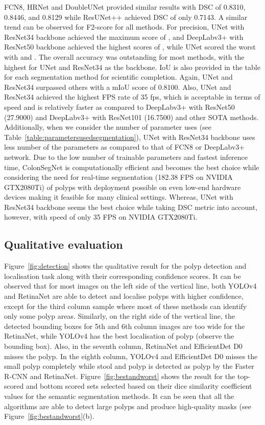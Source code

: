 \documentclass[journal]{IEEEtran}
\begin{document}
FCN8, HRNet and DoubleUNet provided similar results with DSC of 0.8310, 0.8446, and 0.8129 while ResUNet++ achieved DSC of only 0.7143. A similar trend can be observed for F2-score for all methods. For precision, UNet with ResNet34 backbone achieved the maximum score of , and DeepLabv3+ with ResNet50 backbone achieved the highest scores of , while UNet scored the worst with  and . The overall accuracy was outstanding for most methods, with the highest for UNet and ResNet34 as the backbone. IoU is also provided in the table for each segmentation method for scientific completion.  Again, UNet and ResNet34 surpassed others with a mIoU score of 0.8100. Also, UNet and ResNet34 achieved the highest \ac{FPS} rate of 35 fps, which is acceptable in terms of speed and is relatively faster as compared to  DeepLabv3+ with ResNet50 (27.9000) and DeepLabv3+ with ResNet101 (16.7500) and other SOTA methods. Additionally, when we consider the number of parameter uses (see Table~\ref{table:parametersusedsegmentation}), UNet with ResNet34 backbone uses less number of the parameters as compared to that of FCN8 or DeepLabv3+ network. Due to the low number of trainable parameters and fastest inference time, ColonSegNet  is computationally efficient and becomes the best choice while considering the need for real-time segmentation (182.38 FPS on NVIDIA GTX2080Ti) of polyps with deployment possible on even low-end hardware devices making it feasible for many clinical settings. Whereas, UNet with ResNet34 backbone seems the best choice while taking DSC metric into account, however, with speed of only 35 FPS on NVIDIA GTX2080Ti. 







\subsection{Qualitative evaluation} 
Figure~\ref{fig:detection} shows the qualitative result for the polyp detection and localisation task along with their corresponding confidence scores. It can be observed that for most images on the left side of the vertical line, both YOLOv4 and RetinaNet are able to detect and localise polyps with higher confidence, except for the third column sample where most of these methods can identify only some polyp areas. Similarly, on the right side of the vertical line, the detected bounding boxes for 5th and 6th column images are too wide for the RetinaNet, while YOLOv4 has the best localisation of polyp (observe the bounding box). Also, in the seventh column, RetinaNet and EfficientDet D0 misses the polyp. In the eighth column, YOLOv4 and EfficientDet D0 misses the small polyp completely while stool and polyp is detected as polyp by the Faster R-CNN and RetinaNet. Figure~\ref{fig:bestandworst} shows the result for the top-scored and bottom scored sets selected based on their dice similarity coefficient values for the semantic segmentation methods. It can be seen that all the algorithms are able to detect large polyps and produce high-quality masks (see Figure~\ref{fig:bestandworst}(b). 
\end{document}
